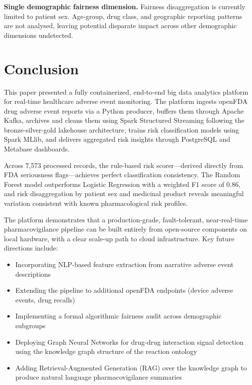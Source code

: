 \documentclass[conference]{IEEEtran}
\begin{document}
\textbf{Single demographic fairness dimension.} Fairness disaggregation is currently limited to patient sex. Age-group, drug class, and geographic reporting patterns are not analysed, leaving potential disparate impact across other demographic dimensions undetected.

\section{Conclusion}

This paper presented a fully containerized, end-to-end big data analytics platform for real-time healthcare adverse event monitoring. The platform ingests openFDA drug adverse event reports via a Python producer, buffers them through Apache Kafka, archives and cleans them using Spark Structured Streaming following the bronze-silver-gold lakehouse architecture, trains risk classification models using Spark MLlib, and delivers aggregated risk insights through PostgreSQL and Metabase dashboards.

Across 7,573 processed records, the rule-based risk scorer—derived directly from FDA seriousness flags—achieves perfect classification consistency. The Random Forest model outperforms Logistic Regression with a weighted F1 score of 0.86, and risk disaggregation by patient sex and medicinal product reveals meaningful variation consistent with known pharmacological risk profiles.

The platform demonstrates that a production-grade, fault-tolerant, near-real-time pharmacovigilance pipeline can be built entirely from open-source components on local hardware, with a clear scale-up path to cloud infrastructure. Key future directions include:
\begin{itemize}
    \item Incorporating NLP-based feature extraction from narrative adverse event descriptions
    \item Extending the pipeline to additional openFDA endpoints (device adverse events, drug recalls)
    \item Implementing a formal algorithmic fairness audit across demographic subgroups
    \item Deploying Graph Neural Networks for drug-drug interaction signal detection using the knowledge graph structure of the reaction ontology
    \item Adding Retrieval-Augmented Generation (RAG) over the knowledge graph to produce natural language pharmacovigilance summaries
\end{itemize}
\end{document}
